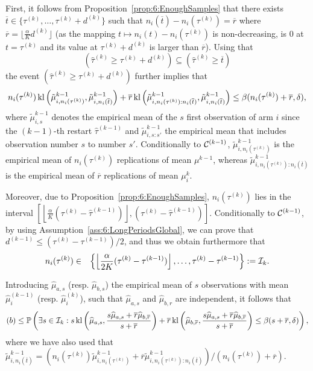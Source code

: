 First, it follows from Proposition~\ref{prop:6:EnoughSamples} that there exists $\overline{t} \in \{\tau^{(k)}, \dots, \tau^{(k)} + d^{(k)} \}$ such that
$n_i(\overline{t}) - n_i(\tau^{(k)}) = \overline{r}$ where $\overline{r} = \lfloor \frac{\alpha}{K} d^{(k)}\rfloor$
(as the mapping $t\mapsto n_i(t) - n_i(\tau^{(k)})$ is non-decreasing, is $0$ at $t=\tau^{(k)}$ and its value at $\tau^{(k)}+d^{(k)}$ is larger than $\overline{r}$).
Using that \[\left(\widehat{\tau}^{(k)} \geq \tau^{(k)} + d^{(k)}\right) \subseteq \left(\widehat{\tau}^{(k)} \geq \overline{t}\right)\]
the event $\left(\widehat{\tau}^{(k)} \geq \tau^{(k)} + d^{(k)}\right)$ further implies that
\[
    n_i(\tau^{(k)}) \, \mathrm{kl}\left(\tilde{\mu}^{k-1}_{i,n_i(\tau^{(k)})},\tilde{\mu}^{k-1}_{i,n_i(\overline{t})}\right)
    + \overline{r} \, \mathrm{kl}\left(\tilde{\mu}^{k-1}_{i,n_i(\tau^{(k)}) : n_i(\overline{t})},\tilde{\mu}^{k-1}_{i,n_i(\overline{t})}\right) \leq \beta(n_i(\tau^{(k)}) + \overline{r},\delta),
\]
where $\tilde{\mu}^{k-1}_{i,s}$ denotes the empirical mean of the $s$ first observation of arm $i$ since the $(k-1)$-th restart $\hat{\tau}^{(k-1)}$ and  $\tilde{\mu}^{k-1}_{i,s:s'}$ the empirical mean that includes observation number $s$ to number $s'$. Conditionally to $\mathcal{C}^{(k-1)}$, $\tilde{\mu}^{k-1}_{i,n_i(\tau^{(k)})}$ is the empirical mean of $n_i(\tau^{(k)})$ \iid{} replications of mean $\mu^{k-1}$, whereas $\tilde{\mu}^{k-1}_{i,n_i(\tau^{(k)}) : n_i(\overline{t})}$ is the empirical mean of $\overline{r}$ \iid{} replications of mean $\mu_i^{k}$.

Moreover, due to Proposition~\ref{prop:6:EnoughSamples}, $n_i(\tau^{(k)})$ lies in the interval $
\left[\left\lfloor \frac{\alpha}{K}\left(\tau^{(k)}-\widehat{\tau}^{(k-1)}\right)\right\rfloor,\left(\tau^{(k)}-\widehat{\tau}^{(k-1)}\right)\right]$.
Conditionally to $\mathcal{C}^{(k-1)}$,
by using Assumption~\ref{ass:6:LongPeriodsGlobal},
we can prove that $d^{(k-1)} \leq (\tau^{(k)} - \tau^{(k-1)})/2$,
and thus we obtain furthermore that
%
\begin{eqnarray*}
    n_i(\tau^{(k)})& \in& \left\{ \left\lfloor \frac{\alpha}{2K} (\tau^{(k)}-\tau^{(k-1)} )\right\rfloor, \dots, \tau^{(k)}-\tau^{(k-1)} \right\} := \mathcal{I}_k.
\end{eqnarray*}

Introducing $\widehat{\mu}_{a,s}$ (resp. $\widehat{\mu}_{b,s}$) the empirical mean of $s$ \iid{} observations with mean $\widehat{\mu}_i^{(k-1)}$ (resp. $\widehat{\mu}_i^{(k)}$), such that $\widehat{\mu}_{a,s}$ and $\widehat{\mu}_{b,r}$ are independent, it follows that
\[
    (b)  \leq \mathbb{P}\left(\exists s \in \mathcal{I}_k : s \, \mathrm{kl}\left(\widehat{\mu}_{a,s},\frac{s\widehat{\mu}_{a,s}+\overline{r}\widehat{\mu}_{b,\overline{r}}}{s+\overline{r}} \right) +  \overline{r} \, \mathrm{kl}\left(\widehat{\mu}_{b,\overline{r}},\frac{s\widehat{\mu}_{a,s}+\overline{r}\widehat{\mu}_{b,\overline{r}}}{s+\overline{r}}  \right)  \leq \beta(s+\overline{r},\delta)\right),
\]
where we have also used that $\tilde{\mu}^{k-1}_{i,n_i(\overline{t})} = \left(n_i(\tau^{(k)})\tilde{\mu}^{k-1}_{i,n_i(\tau^{(k)})} + \overline{r}\tilde{\mu}^{k-1}_{i,n_i(\tau^{(k)}) : n_i(\overline{t})} \right) / (n_i(\tau^{(k)}) + \overline{r})$.

